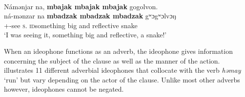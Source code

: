 \ea \label{ex:3:147}\\
Námənjar  na,  \textbf{mbajak  mbajak  mbajak}  gogolvon.\\
\gll  ná-mənzar   na  \textbf{mbadzak  mbadzak  mbadzak}  gʷɔgʷɔlvɔŋ\\
      {\oneS}+{\IFV}-see  \textsc{s}.{\DO}  {\textsc{id}something big and reflective}  snake\\
\glt  ‘I was seeing it, something big and reflective, a snake!’
\z

When an ideophone functions as an adverb, the ideophone gives information concerning the subject of the clause as well as the manner of the action.   illustrates 11 different adverbial ideophones that collocate with the verb \textit{həmay} ‘run’ but vary depending on the actor of the clause. Unlike most other adverbs however, ideophones cannot be negated.

